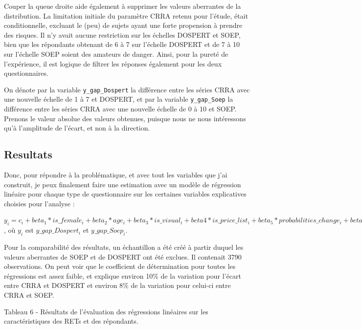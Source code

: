 \documentclass[12pt]{article}
\begin{document}
Couper la queue droite aide également à supprimer les valeurs aberrantes
de la distribution. La limitation initiale du paramètre CRRA retenu pour
l'étude, était conditionnelle, excluant le (peu) de sujets ayant une
forte propension à prendre des risques. Il n'y avait aucune restriction
sur les échelles DOSPERT et SOEP, bien que les répondants obtenant de 6
à 7 sur l'échelle DOSPERT et de 7 à 10 sur l'échelle SOEP soient des
amateurs de danger. Ainsi, pour la pureté de l'expérience, il est
logique de filtrer les réponses également pour les deux questionnaires.

On dénote par la variable \texttt{y\_gap\_Dospert} la différence entre
les séries CRRA avec une nouvelle échelle de 1 à 7 et DOSPERT, et par la
variable \texttt{y\_gap\_Soep} la différence entre les séries CRRA avec
une nouvelle échelle de 0 à 10 et SOEP. Prenons le valeur absolue des
valeurs obtenues, puisque nous ne nous intéressons qu'à l'amplitude de
l'écart, et non à la direction.

\subsection{Resultats}

Donc, pour répondre à la problématique, et avec tout les variables que
j'ai construit, je peux finalement faire une estimation avec un modèle
de régression linéaire pour chaque type de questionnaire sur les
certaines variables explicatives choisies pour l'analyse :

\(y_i = c_i + beta_1 * is\_female_i+ beta_2 * age_i + beta_3 * is\_visual_i + beta4 * is\_price\_list_i + beta_5 * probabilities\_change_i + beta_6 * stakes_i + beta_7 * germany_i + epsilon_i\)
, où \(y_i\) est \(y\_gap\_Dospert_i\) et \(y\_gap\_Soep_i\).

Pour la comparabilité des résultats, un échantillon a été créé à partir
duquel les valeurs aberrantes de SOEP et de DOSPERT ont été exclues. Il
contenait 3790 observations. On peut voir que le coefficient de
détermination pour toutes les régressions est assez faible, et explique
environ 10\% de la variation pour l'écart entre CRRA et DOSPERT et
environ 8\% de la variation pour celui-ci entre CRRA et SOEP.

Tableau 6 - Résultats de l'évaluation des régressions linéaires sur les
caractéristiques des RETs et des répondants.
\end{document}
